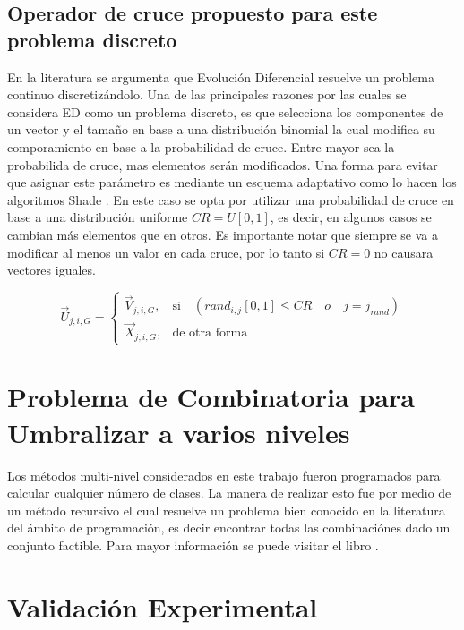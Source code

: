 \documentclass[preprint,12pt]{elsarticle}
\begin{document}
\subsection{Operador de cruce propuesto para este problema discreto}
En la literatura se argumenta que Evolución Diferencial resuelve un problema continuo discretizándolo.
%
Una de las principales razones por las cuales se considera ED como un problema discreto, es que selecciona los componentes de un vector y el tamaño en base a una distribución binomial la cual modifica su comporamiento en base a la probabilidad de cruce.
%
Entre mayor sea la probabilida de cruce, mas elementos serán modificados.
%
Una forma para evitar que asignar este parámetro es mediante un esquema adaptativo como lo hacen los algoritmos Shade \cite{tanabe2013success}.
%
En este caso se opta por utilizar una probabilidad de cruce en base a una distribución uniforme $CR = U[0,1]$, es decir, en algunos casos se cambian más elementos que en otros.
%
Es importante notar que siempre se va a modificar al menos un valor en cada cruce, por lo tanto si $CR=0$ no causara vectores iguales.

\begin{equation} 
\vec{U}_{j,i,G}= 
\begin{cases}
    \vec{V}_{j,i,G},& \text{si} \quad (rand_{i,j}[0,1] \leq CR \quad o \quad j = j_{rand}  )\\
    \vec{X}_{j,i,G},              & \text{de otra forma}
\end{cases}
\end{equation}

\section{Problema de Combinatoria para Umbralizar a varios niveles}

Los métodos multi-nivel considerados en este trabajo fueron programados para calcular cualquier número de clases.
%
La manera de realizar esto fue por medio de un método recursivo el cual resuelve un problema bien conocido en la literatura del ámbito de programación, es decir encontrar todas las combinaciónes dado un conjunto factible.
%
Para mayor información se puede visitar el libro \citet{cormen2009introduction}.


\section{Validación Experimental}
\end{document}
